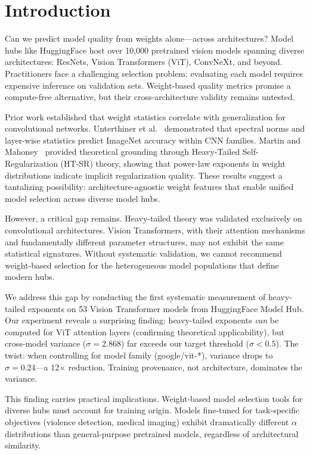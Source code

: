 \section{Introduction}

Can we predict model quality from weights alone---across architectures? Model hubs like HuggingFace host over 10,000 pretrained vision models spanning diverse architectures: ResNets, Vision Transformers (ViT), ConvNeXt, and beyond. Practitioners face a challenging selection problem: evaluating each model requires expensive inference on validation sets. Weight-based quality metrics promise a compute-free alternative, but their cross-architecture validity remains untested.

Prior work established that weight statistics correlate with generalization for convolutional networks. Unterthiner et al.~\cite{unterthiner2020predicting} demonstrated that spectral norms and layer-wise statistics predict ImageNet accuracy within CNN families. Martin and Mahoney~\cite{martin2021implicit} provided theoretical grounding through Heavy-Tailed Self-Regularization (HT-SR) theory, showing that power-law exponents in weight distributions indicate implicit regularization quality. These results suggest a tantalizing possibility: architecture-agnostic weight features that enable unified model selection across diverse model hubs.

However, a critical gap remains. Heavy-tailed theory was validated exclusively on convolutional architectures. Vision Transformers, with their attention mechanisms and fundamentally different parameter structures, may not exhibit the same statistical signatures. Without systematic validation, we cannot recommend weight-based selection for the heterogeneous model populations that define modern hubs.

We address this gap by conducting the first systematic measurement of heavy-tailed exponents on 53 Vision Transformer models from HuggingFace Model Hub. Our experiment reveals a surprising finding: heavy-tailed exponents \emph{can} be computed for ViT attention layers (confirming theoretical applicability), but cross-model variance ($\sigma = 2.868$) far exceeds our target threshold ($\sigma < 0.5$). The twist: when controlling for model family (google/vit-*), variance drops to $\sigma = 0.24$---a 12$\times$ reduction. Training provenance, not architecture, dominates the variance.

This finding carries practical implications. Weight-based model selection tools for diverse hubs must account for training origin. Models fine-tuned for task-specific objectives (violence detection, medical imaging) exhibit dramatically different $\alpha$ distributions than general-purpose pretrained models, regardless of architectural similarity.

